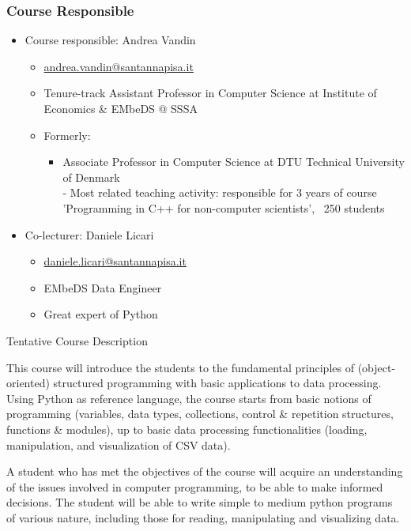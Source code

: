 \documentclass{beamer}%
\begin{document}
\begin{frame}
\frametitle{Course Responsible}
 \begin{itemize}
   \item Course responsible: Andrea Vandin
	\begin{itemize}
      \item\href{mailto:andrea.vandin@santannapisa.it}{\color{blue}andrea.vandin@santannapisa.it}
	  \item Tenure-track Assistant Professor in Computer Science at Institute of Economics \& EMbeDS @ SSSA
	  \item Formerly: 
	  \begin{itemize}
      \item Associate Professor in Computer Science at DTU Technical University of Denmark
	   \\
	   {\scriptsize- Most related teaching activity: responsible for 3 years of course 'Programming in C++ for non-computer scientists', ~250 students}
	  \end{itemize}
    \end{itemize}
      \item Co-lecturer: Daniele Licari
	\begin{itemize}
	\item \href{mailto:daniele.licari@santannapisa.it}{\color{blue}daniele.licari@santannapisa.it}
	\item EMbeDS Data Engineer 
	\item Great expert of Python
	\end{itemize}
	\end{itemize}
\end{frame}



\begin{frame}{Tentative Course Description}
\begin{block}{This course will}
 introduce the students to the fundamental principles of (object- oriented)
 structured programming with basic applications to data processing. Using Python as reference language, the course starts from basic notions of programming (variables, data types, collections, control \& repetition structures, functions \& modules), up to basic data processing functionalities (loading, manipulation, and visualization of CSV data). 
\end{block}

\pause

\begin{block}{A student who has met the objectives of the course will}
 acquire an understanding of the issues involved in computer programming, to be able to make informed decisions. The student will be able to write simple to medium python programs of various nature, including those for reading, manipulating and visualizing data. %
\end{block}
\end{frame}
\end{document}
